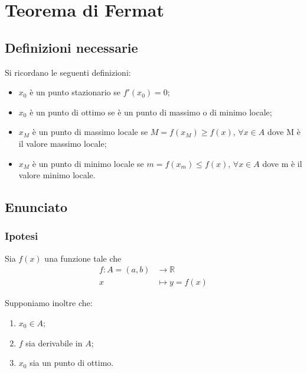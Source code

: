 \documentclass[../../dimostrazioni]{subfiles}
\begin{document}
    \chapter{Teorema di Fermat}
    \label{teoFermat}

        \section*{Definizioni necessarie}

            Si ricordano le seguenti definizioni:

            \begin{itemize}
                \item \(x_0\) è un punto stazionario se \(f'(x_0) = 0\);
                \item \(x_0\) è un punto di ottimo se è un punto di massimo o di minimo locale;
                \item \(x_M\) è un punto di massimo locale se \(M = f(x_M) \geqslant f(x), \, \forall  x \in A\) dove M è il valore massimo locale;
                \item \(x_M\) è un punto di minimo locale se \(m = f(x_m) \leqslant f(x), \, \forall  x \in A\) dove m è il valore minimo locale.
            \end{itemize}

        \section*{Enunciato}

            \subsection*{Ipotesi}

                Sia \(f(x)\) una funzione tale che
                \begin{align*}
                    f : A = (a, b) &\longrightarrow \mathbb{R}\\
                    x &\longmapsto y = f(x) 
                \end{align*}

                Supponiamo inoltre che:

            \begin{enumerate}
                \indentitem \item \(x_0 \in A\);
                \indentitem \item \(f\) sia derivabile in \(A\);
                \indentitem \item \(x_0\) sia un punto di ottimo.
            \end{enumerate}
\end{document}
